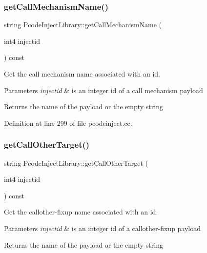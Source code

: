 \subsubsection{\texorpdfstring{getCallMechanismName()}{getCallMechanismName()}}
{\footnotesize\ttfamily string Pcode\+Inject\+Library\+::get\+Call\+Mechanism\+Name (\begin{DoxyParamCaption}\item[{int4}]{injectid }\end{DoxyParamCaption}) const}



Get the call mechanism name associated with an id. 


\begin{DoxyParams}{Parameters}
{\em injectid} & is an integer id of a call mechanism payload \\
\hline
\end{DoxyParams}
\begin{DoxyReturn}{Returns}
the name of the payload or the empty string 
\end{DoxyReturn}


Definition at line 299 of file pcodeinject.\+cc.

\mbox{\label{class_pcode_inject_library_a928588313e2dfb9454b65f932985d97c}} 
\subsubsection{\texorpdfstring{getCallOtherTarget()}{getCallOtherTarget()}}
{\footnotesize\ttfamily string Pcode\+Inject\+Library\+::get\+Call\+Other\+Target (\begin{DoxyParamCaption}\item[{int4}]{injectid }\end{DoxyParamCaption}) const}



Get the callother-\/fixup name associated with an id. 


\begin{DoxyParams}{Parameters}
{\em injectid} & is an integer id of a callother-\/fixup payload \\
\hline
\end{DoxyParams}
\begin{DoxyReturn}{Returns}
the name of the payload or the empty string 
\end{DoxyReturn}


